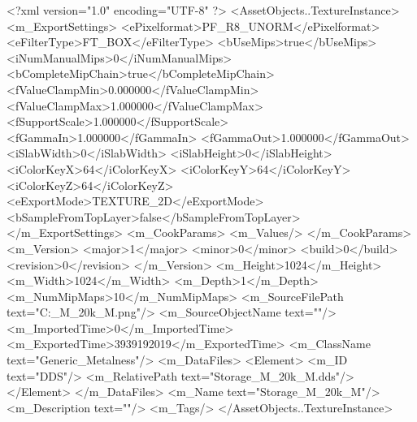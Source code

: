 <?xml version="1.0" encoding="UTF-8" ?>
<AssetObjects..TextureInstance>
	<m_ExportSettings>
		<ePixelformat>PF_R8_UNORM</ePixelformat>
		<eFilterType>FT_BOX</eFilterType>
		<bUseMips>true</bUseMips>
		<iNumManualMips>0</iNumManualMips>
		<bCompleteMipChain>true</bCompleteMipChain>
		<fValueClampMin>0.000000</fValueClampMin>
		<fValueClampMax>1.000000</fValueClampMax>
		<fSupportScale>1.000000</fSupportScale>
		<fGammaIn>1.000000</fGammaIn>
		<fGammaOut>1.000000</fGammaOut>
		<iSlabWidth>0</iSlabWidth>
		<iSlabHeight>0</iSlabHeight>
		<iColorKeyX>64</iColorKeyX>
		<iColorKeyY>64</iColorKeyY>
		<iColorKeyZ>64</iColorKeyZ>
		<eExportMode>TEXTURE_2D</eExportMode>
		<bSampleFromTopLayer>false</bSampleFromTopLayer>
	</m_ExportSettings>
	<m_CookParams>
		<m_Values/>
	</m_CookParams>
	<m_Version>
		<major>1</major>
		<minor>0</minor>
		<build>0</build>
		<revision>0</revision>
	</m_Version>
	<m_Height>1024</m_Height>
	<m_Width>1024</m_Width>
	<m_Depth>1</m_Depth>
	<m_NumMipMaps>10</m_NumMipMaps>
	<m_SourceFilePath text="C:\Users\Shadow\Desktop\Prototypes\Storage_M_20k_M.png"/>
	<m_SourceObjectName text=""/>
	<m_ImportedTime>0</m_ImportedTime>
	<m_ExportedTime>3939192019</m_ExportedTime>
	<m_ClassName text="Generic_Metalness"/>
	<m_DataFiles>
		<Element>
			<m_ID text="DDS"/>
			<m_RelativePath text="Storage_M_20k_M.dds"/>
		</Element>
	</m_DataFiles>
	<m_Name text="Storage_M_20k_M"/>
	<m_Description text=""/>
	<m_Tags/>
</AssetObjects..TextureInstance>

